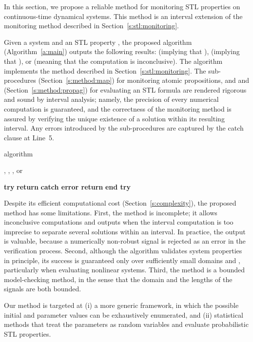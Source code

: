 \documentclass[paper]{ieice}
\begin{document}
In this section, we propose a reliable method for monitoring STL properties on continuous-time dynamical systems. This method is an interval extension of the monitoring method described in Section~\ref{s:stl:monitoring}.

Given a system  and an STL property , the proposed  algorithm (Algorithm~\ref{a:main}) outputs the following results:
 (implying that ),
 (implying that ), or
 (meaning that the computation is inconclusive).
The algorithm implements the method described in Section~\ref{s:stl:monitoring}.
The sub-procedures  (Section~\ref{s:method:map}) for monitoring atomic propositions, and  and  (Section~\ref{s:method:propag}) for evaluating an STL formula are rendered rigorous and sound by interval analysis;
namely, the precision of every numerical computation is guaranteed, and the correctness of the monitoring method is assured by verifying the unique existence of a solution within its resulting interval.
Any errors introduced by the sub-procedures are captured by the catch clause at Line~5.

\begin{algorithm}[thb]
\caption{\label{a:main}  algorithm}

\begin{algorithmic}[1]
  \REQUIRE , 
  \ENSURE , , or 

  \STATE \textbf{try}
  \STATE \quad 
  \hfill{}
  \STATE \quad 
  \hfill{}
  \STATE \quad \textbf{return} {}
  \hfill{}
  \STATE \textbf{catch error return}  \textbf{end try}
\end{algorithmic}
\end{algorithm}

Despite its efficient computational cost (Section~\ref{s:complexity}), the proposed method has some limitations.
First, the method is incomplete; it allows inconclusive computations and outputs  when the interval computation is too imprecise to separate several solutions within an interval.
In practice, the  output is valuable, because a numerically non-robust signal is rejected as an error in the verification process.
Second, although the algorithm validates system properties in principle, its success is guaranteed only over sufficiently small domains  and , particularly when evaluating nonlinear systems.
Third, the method is a bounded model-checking method, in the sense that the domain  and the lengths of the signals are both bounded.

Our method is targeted at (i) a more generic framework, in which the possible initial and parameter values can be exhaustively enumerated, and (ii) statistical methods that treat the parameters as random variables and evaluate probabilistic STL properties.
\end{document}
